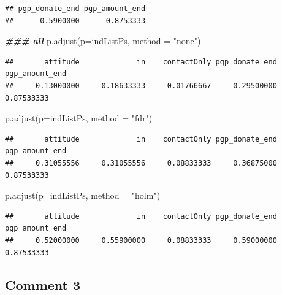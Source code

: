 \documentclass[
]{article}
\newenvironment{Shaded}{\begin{snugshade}}{\end{snugshade}}
\newcommand{\AttributeTok}[1]{\textcolor[rgb]{0.77,0.63,0.00}{#1}}
\newcommand{\DocumentationTok}[1]{\textcolor[rgb]{0.56,0.35,0.01}{\textbf{\textit{#1}}}}
\newcommand{\FunctionTok}[1]{\textcolor[rgb]{0.00,0.00,0.00}{#1}}
\newcommand{\NormalTok}[1]{#1}
\newcommand{\StringTok}[1]{\textcolor[rgb]{0.31,0.60,0.02}{#1}}
\begin{document}
\begin{verbatim}
## pgp_donate_end pgp_amount_end 
##      0.5900000      0.8753333
\end{verbatim}

\begin{Shaded}
\begin{Highlighting}[]
\DocumentationTok{\#\#\# all}
\FunctionTok{p.adjust}\NormalTok{(}\AttributeTok{p=}\NormalTok{indListPs, }\AttributeTok{method =} \StringTok{"none"}\NormalTok{)}
\end{Highlighting}
\end{Shaded}

\begin{verbatim}
##       attitude             in    contactOnly pgp_donate_end pgp_amount_end 
##     0.13000000     0.18633333     0.01766667     0.29500000     0.87533333
\end{verbatim}

\begin{Shaded}
\begin{Highlighting}[]
\FunctionTok{p.adjust}\NormalTok{(}\AttributeTok{p=}\NormalTok{indListPs, }\AttributeTok{method =} \StringTok{"fdr"}\NormalTok{)}
\end{Highlighting}
\end{Shaded}

\begin{verbatim}
##       attitude             in    contactOnly pgp_donate_end pgp_amount_end 
##     0.31055556     0.31055556     0.08833333     0.36875000     0.87533333
\end{verbatim}

\begin{Shaded}
\begin{Highlighting}[]
\FunctionTok{p.adjust}\NormalTok{(}\AttributeTok{p=}\NormalTok{indListPs, }\AttributeTok{method =} \StringTok{"holm"}\NormalTok{)}
\end{Highlighting}
\end{Shaded}

\begin{verbatim}
##       attitude             in    contactOnly pgp_donate_end pgp_amount_end 
##     0.52000000     0.55900000     0.08833333     0.59000000     0.87533333
\end{verbatim}

\hypertarget{comment-3}{%
\subsection{Comment 3}\label{comment-3}}
\end{document}
